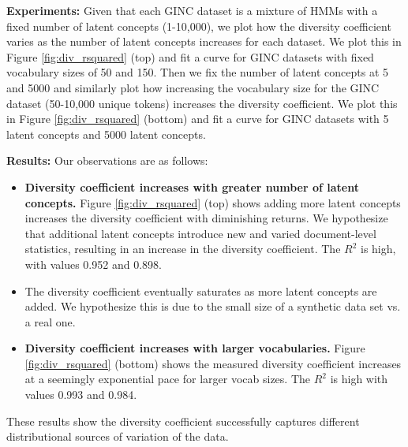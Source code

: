 \textbf{Experiments:}
Given that each GINC dataset is a mixture of HMMs with a fixed number of latent concepts (1-10,000), we plot how the diversity coefficient varies as the number of latent concepts increases for each dataset.
We plot this in Figure \ref{fig:div_rsquared} (top) and fit a curve for GINC datasets with fixed vocabulary sizes of 50 and 150.
Then we fix the number of latent concepts at 5 and 5000 and similarly plot how increasing the vocabulary size for the GINC dataset (50-10,000 unique tokens) increases the diversity coefficient.
We plot this in Figure \ref{fig:div_rsquared} (bottom) and fit a curve for GINC datasets with 5 latent concepts and 5000 latent concepts.

\textbf{Results:}
Our observations are as follows:
\begin{itemize}
    \item \textbf{Diversity coefficient increases with greater number of latent concepts.} 
    Figure \ref{fig:div_rsquared} (top) shows adding more latent concepts increases the diversity coefficient with diminishing returns.
    We hypothesize that additional latent concepts introduce new and varied document-level statistics, resulting in an increase in the diversity coefficient.
    The $R^2$ is high, with values 0.952 and 0.898.
    \item The diversity coefficient eventually saturates as more latent concepts are added. 
    We hypothesize this is due to the small size of a synthetic data set vs. a real one.
    \item \textbf{Diversity coefficient increases with larger vocabularies.}
    Figure \ref{fig:div_rsquared} (bottom) shows the measured diversity coefficient increases at a seemingly exponential pace for larger vocab sizes.
    The $R^2$ is high with values 0.993 and 0.984.
\end{itemize}
These results show the diversity coefficient successfully captures different distributional sources of variation of the data.

